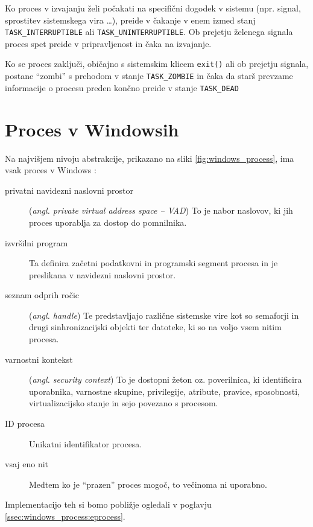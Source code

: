 \documentclass[a4paper,12pt,openright]{book}
\begin{document}
Ko proces v izvajanju želi počakati na specifični dogodek v sistemu (npr. signal, sprostitev sistemskega vira \dots), preide v čakanje v enem izmed stanj \texttt{TASK\_INTERRUPTIBLE} ali \texttt{TASK\_UNINTERRUPTIBLE}.
Ob prejetju želenega signala proces spet preide v pripravljenost in čaka na izvajanje.

Ko se proces zaključi, običajno s sistemskim klicem \texttt{exit()} ali ob prejetju signala, postane ``zombi'' s prehodom v stanje \texttt{TASK\_ZOMBIE} in čaka da starš prevzame informacije o procesu preden končno preide v stanje \texttt{TASK\_DEAD}

\section{Proces v Windowsih}

Na najvišjem nivoju abstrakcije, prikazano na sliki \ref{fig:windows_process}, ima vsak proces v Windows \cite{Yosifovich_Russinovich_Solomon_Ionescu_2017}:
\begin{description}
	\item[privatni navidezni naslovni prostor] (\textit{angl. private virtual address space -- VAD}) To je nabor naslovov, ki jih proces uporablja za dostop do pomnilnika.
	\item[izvršilni program] Ta definira začetni podatkovni in programski segment procesa in je preslikana v navidezni naslovni prostor.
	\item[seznam odprih ročic]  (\textit{angl. handle}) Te predstavljajo različne sistemske vire kot so semaforji in drugi sinhronizacijski objekti ter datoteke, ki so na voljo vsem nitim procesa.
	\item[varnostni kontekst] (\textit{angl. security context}) To je dostopni žeton oz. poverilnica, ki identificira uporabnika, varnostne skupine, privilegije, atribute, pravice, sposobnosti, virtualizacijsko stanje in sejo povezano s procesom.
	\item[ID procesa] Unikatni identifikator procesa.
	\item[vsaj eno nit] Medtem ko je ``prazen'' proces mogoč, to večinoma ni uporabno. 
\end{description}
Implementacijo teh si bomo pobližje ogledali v poglavju \ref{ssec:windows_process:eprocess}.
\end{document}
